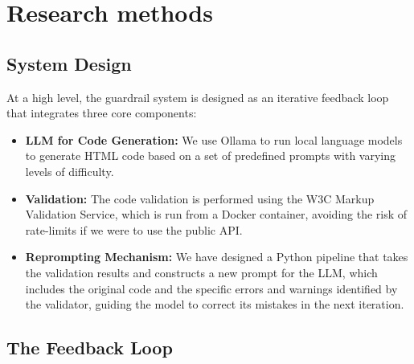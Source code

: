 \section{Research methods}
\label{sec:research-methods}

\subsection{System Design}



At a high level, the guardrail system is designed as an iterative feedback loop that integrates three core components:

\begin{itemize}
	\item \textbf{LLM for Code Generation:} We use Ollama to run local language models to generate HTML code based on a set of predefined prompts with varying levels of difficulty.
	\item \textbf{Validation:} The code validation is performed using the W3C Markup Validation Service, which is run from a Docker container, avoiding the risk of rate-limits if we were to use the public API.
	\item \textbf{Reprompting Mechanism:} We have designed a Python pipeline that takes the validation results and constructs a new prompt for the LLM, which includes the original code and the specific errors and warnings identified by the validator, guiding the model to correct its mistakes in the next iteration.
\end{itemize}


\subsection{The Feedback Loop}




